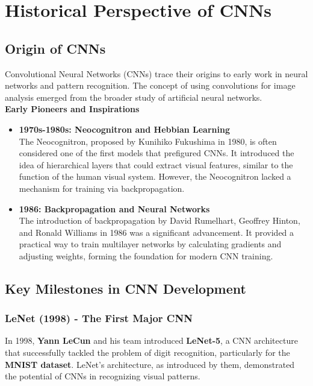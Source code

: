 \chapter{Historical Perspective of CNNs}\label{chp:2}
\section{Origin of CNNs}
Convolutional Neural Networks (CNNs) trace their origins to early work in neural networks and pattern recognition. The concept of using convolutions for image analysis emerged from the broader study of artificial neural networks.\\

\textbf{Early Pioneers and Inspirations}
\begin{itemize}
    \item \textbf{1970s-1980s: Neocognitron and Hebbian Learning}\\
    The Neocognitron, proposed by Kunihiko Fukushima in 1980, is often considered one of the first models that prefigured CNNs. It introduced the idea of hierarchical layers that could extract visual features, similar to the function of the human visual system. However, the Neocognitron lacked a mechanism for training via backpropagation.\cite{fukushima1980neocognitron}
    \item \textbf{1986: Backpropagation and Neural Networks}\\
    The introduction of backpropagation by David Rumelhart, Geoffrey Hinton, and Ronald Williams in 1986 was a significant advancement. It provided a practical way to train multilayer networks by calculating gradients and adjusting weights, forming the foundation for modern CNN training.\cite{rumelhart1986learning}
\end{itemize}

\section{Key Milestones in CNN Development}
\subsection{LeNet (1998) - The First Major CNN}
In 1998, \textbf{Yann LeCun} and his team introduced \textbf{LeNet-5}, a CNN architecture that successfully tackled the problem of digit recognition, particularly for the \textbf{MNIST dataset}. LeNet’s architecture, as introduced by them, demonstrated the potential of CNNs in recognizing visual patterns.\cite{lecun1998gradient} \cite{lecun1990handwritten}\\


